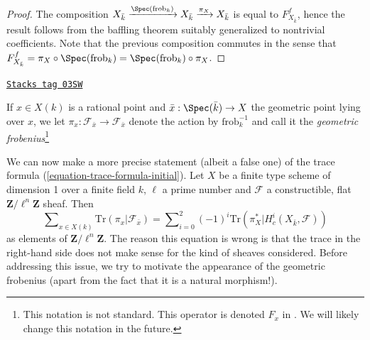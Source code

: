 \begin{proof}
The composition $X_{\bar k} \xrightarrow{\Spec(\text{frob}_k)} X_{\bar k}
\xrightarrow{\pi_X} X_{\bar k}$ is equal to $F_{X_{\bar k}}^f$, hence the
result follows from the baffling theorem suitably generalized to nontrivial
coefficients. Note that the previous composition commutes in the sense that
$F_{X_{\bar k}}^f = \pi_X \circ \Spec(\text{frob}_k) =
\Spec(\text{frob}_k) \circ \pi_X$.
\end{proof}

\begin{definition}
\label{trace-definition-geometric-frobenius-on-stalk}
\href{https://stacks.math.columbia.edu/tag/03SW}{\texttt{Stacks tag 03SW}}

If $x \in X(k)$ is a rational point and $\bar x : \Spec(\bar k) \to X$
the geometric point lying over $x$, we let $\pi_x : \mathcal{F}_{\bar x} \to
\mathcal{F}_{\bar x}$ denote the action by $\text{frob}_k^{-1}$ and call it the
{\it geometric frobenius}\footnote{This notation is not standard.
This operator is denoted $F_x$ in \cite{SGA4.5}. We will likely change
this notation in the future.}
\end{definition}

We can now make a more precise statement (albeit a false one) of the trace
formula (\ref{equation-trace-formula-initial}). Let $X$ be a finite
type scheme of dimension 1
over a finite field $k$, $\ell$ a prime number and $\mathcal{F}$ a
constructible, flat $\mathbf{Z}/\ell^n\mathbf{Z}$ sheaf. Then
\begin{equation}
\label{equation-trace-formula-second}
\sum\nolimits_{x \in X(k)}
\text{Tr}(\pi_x | \mathcal{F}_{\bar x})
=
\sum\nolimits_{i = 0}^2
(-1)^i \text{Tr}(\pi_X^* | H^i_c(X_{\bar k}, \mathcal{F}))
\end{equation}
as elements of $\mathbf{Z}/\ell^n\mathbf{Z}$. The reason this equation is wrong
is that the trace in the right-hand side does not make sense for the kind of
sheaves considered. Before addressing this issue, we try to motivate the
appearance of the geometric frobenius (apart from the fact that it is a natural
morphism!).

